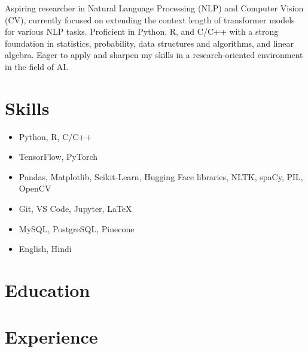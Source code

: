 \documentclass[letterpaper, 10pt]{article}
\begin{document}




Aspiring researcher in Natural Language Processing (NLP) and Computer Vision (CV), currently focused on extending the context length of transformer models for various NLP tasks.
Proficient in Python, R, and C/C++ with a strong foundation in statistics, probability, data structures and algorithms, and linear algebra.
Eager to apply and sharpen my skills in a research-oriented environment in the field of AI.


\section{Skills}

\begin{itemize}[itemsep=-2px, parsep=1pt, leftmargin=130pt]
  \item[\textbf{Programming Languages}] Python, R, C/C++
  \item[\textbf{Frameworks}] TensorFlow, PyTorch
  \item[\textbf{Libraries}] Pandas, Matplotlib, Scikit-Learn, Hugging Face libraries, NLTK, spaCy, PIL, OpenCV
  \item[\textbf{Tools}] Git, VS Code, Jupyter, LaTeX
  \item[\textbf{Databases}] MySQL, PostgreSQL, Pinecone
  \item[\textbf{Languages}] English, Hindi
\end{itemize}


\section{Education}




\section{Experience}



\end{document}

